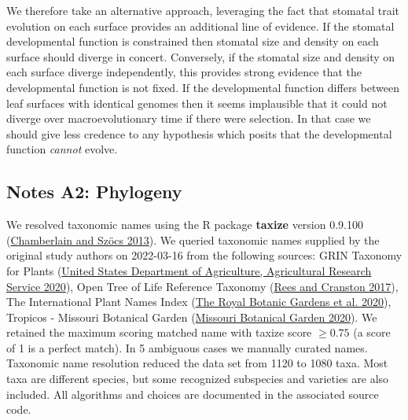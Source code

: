 \documentclass[
  12pt,
]{article}
\begin{document}
We therefore take an alternative approach, leveraging the fact that stomatal trait evolution on each surface provides an additional line of evidence. If the stomatal developmental function is constrained then stomatal size and density on each surface should diverge in concert. Conversely, if the stomatal size and density on each surface diverge independently, this provides strong evidence that the developmental function is not fixed. If the developmental function differs between leaf surfaces with identical genomes then it seems implausible that it could not diverge over macroevolutionary time if there were selection. In that case we should give less credence to any hypothesis which posits that the developmental function \emph{cannot} evolve.

\clearpage

\hypertarget{notes-a2-phylogeny}{%
\subsection{Notes A2: Phylogeny}\label{notes-a2-phylogeny}}

We resolved taxonomic names using the R package \textbf{taxize} version 0.9.100 (\protect\hyperlink{ref-chamberlain_taxize_2013}{Chamberlain and Szöcs 2013}). We queried taxonomic names supplied by the original study authors on 2022-03-16 from the following sources: GRIN Taxonomy for Plants (\protect\hyperlink{ref-united_states_department_of_agriculture_agricultural_research_service_germplasm_2020}{United States Department of Agriculture, Agricultural Research Service 2020}), Open Tree of Life Reference Taxonomy (\protect\hyperlink{ref-rees_automated_2017}{Rees and Cranston 2017}), The International Plant Names Index (\protect\hyperlink{ref-the_royal_botanic_gardens_international_2020}{The Royal Botanic Gardens et al. 2020}), Tropicos - Missouri Botanical Garden (\protect\hyperlink{ref-missouri_botanical_garden_tropicos_2020}{Missouri Botanical Garden 2020}). We retained the maximum scoring matched name with taxize score \(\ge 0.75\) (a score of 1 is a perfect match). In 5 ambiguous cases we manually curated names. Taxonomic name resolution reduced the data set from 1120 to 1080 taxa. Most taxa are different species, but some recognized subspecies and varieties are also included. All algorithms and choices are documented in the associated source code.
\end{document}
